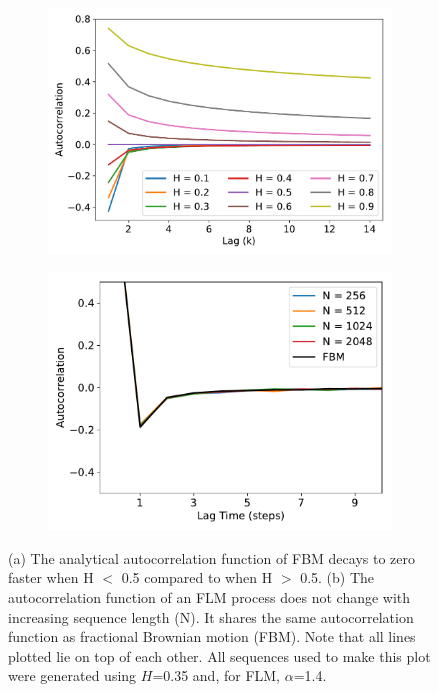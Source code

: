 \documentclass{article}
\begin{document}
  \begin{figure}
  \centering
  \begin{subfigure}{0.45\textwidth}
  \includegraphics[width=\textwidth]{hurst_autocorrelation.pdf}
  \caption{}\label{fig:hurst_autocorrelation}
  \end{subfigure}
  \begin{subfigure}{0.45\textwidth}
  \includegraphics[width=\textwidth]{flm_autocovariance.pdf}
  \caption{}\label{fig:flm_autocorrelation}
  \end{subfigure}  
  \caption{(a) The analytical autocorrelation function of FBM decays to zero faster
  when H $<$ 0.5 compared to when H $>$ 0.5. (b) The autocorrelation function of an 
  FLM process does not change with increasing sequence length (N). It shares the same
  autocorrelation function as fractional Brownian motion (FBM). Note that all lines
  plotted lie on top of each other. All sequences used to make this plot were generated
  using $H$=0.35 and, for FLM, $\alpha$=1.4.}\label{fig:hurst_parameters}
  \end{figure}
  
\end{document}
